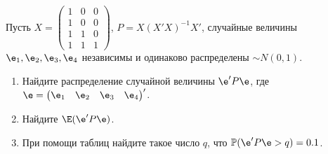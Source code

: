 \documentclass[pdftex,11pt,openany]{book}\usepackage[]{graphicx}\usepackage[]{color}
\begin{document}
\begin{problem}

Пусть $X = \begin{pmatrix} 1 & 0 & 0 \\ 1 & 0 & 0 \\ 1 & 1 & 0  \\ 1 & 1 & 1 \end{pmatrix} $, $P = X(X'X)^{-1}X'$, случайные величины $\e_1, \e_2, \e_3, \e_4$ независимы и одинаково распределены $\sim N (0,1)$.
\begin{enumerate}
\item Найдите распределение случайной величины $\e'P\e$, где $\e = \begin{pmatrix} \e_1 & \e_2 & \e_3 & \e_4 \end{pmatrix}'$.
\item Найдите $\E(\e'P\e)$.
\item При помощи таблиц найдите такое число $q$, что $\mathbb{P}(\e'P\e > q)=0.1$. 
\end{enumerate}
\end{problem}

\begin{solution}
\end{solution}
\end{document}
